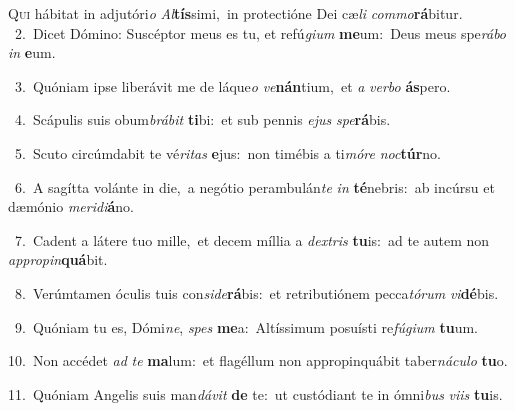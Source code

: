 \lettrine{\initial\textcolor{\initialcolor}{Q}}{ui} hábitat in adjutóri\textit{o} \textit{Al}\-\textbf{tís}simi,~\star in protectióne Dei cæ\textit{li} \textit{com}\-\textit{mo}\textbf{rá}bitur.\\
{\numbfont\textcolor{\numbcolor}{~2.}}~Dicet Dómino: Suscéptor meus es tu, et refú\-\textit{gi}\-\textit{um} \textbf{me}\-um:~\star Deus meus spe\-\textit{rá}\-\textit{bo} \textit{in} \textbf{e}\-um.\par
{\numbfont\textcolor{\numbcolor}{~3.}}~Quóniam ipse liberávit me de láque\textit{o} \textit{ve}\-\textbf{nán}tium,~\star et \textit{a} \textit{ver}\-\textit{bo} \textbf{ás}\-pero.\par
{\numbfont\textcolor{\numbcolor}{~4.}}~Scápulis suis obum\-\textit{brá}\-\textit{bit} \textbf{ti}\-bi:~\star et sub pennis \textit{e}\-\textit{jus} \textit{spe}\-\textbf{rá}bis.\par
{\numbfont\textcolor{\numbcolor}{~5.}}~Scuto circúmdabit te vé\-\textit{ri}\-\textit{tas} \textbf{e}\-jus:~\star non timébis a ti\-\textit{mó}\-\textit{re} \textit{noc}\-\textbf{túr}no.\par
{\numbfont\textcolor{\numbcolor}{~6.}}~A sagítta volánte in die,~\dagger a negótio perambulán\textit{te} \textit{in} \textbf{té}\-nebris:~\star ab incúrsu et dæmónio \textit{me}\-\textit{ri}\textit{di}\textbf{á}no.\par
{\numbfont\textcolor{\numbcolor}{~7.}}~Cadent a látere tuo mille,~\dagger et decem míllia a \textit{dex}\-\textit{tris} \textbf{tu}\-is:~\star ad te autem non \textit{ap}\-\textit{pro}\textit{pin}\textbf{quá}bit.\par
{\numbfont\textcolor{\numbcolor}{~8.}}~Verúmtamen óculis tuis con\-\textit{si}\-\textit{de}\textbf{rá}bis:~\star et retributiónem pecca\-\textit{tó}\-\textit{rum} \textit{vi}\-\textbf{dé}bis.\par
{\numbfont\textcolor{\numbcolor}{~9.}}~Quóniam tu es, Dómi\-\textit{ne}\-, \textit{spes} \textbf{me}\-a:~\star Altíssimum posuísti re\-\textit{fú}\-\textit{gi}\textit{um} \textbf{tu}\-um.\par
{\numbfont\textcolor{\numbcolor}{10.}}~Non accédet \textit{ad} \textit{te} \textbf{ma}\-lum:~\star et flagéllum non appropinquábit taber\-\textit{ná}\-\textit{cu}\textit{lo} \textbf{tu}\-o.\par
{\numbfont\textcolor{\numbcolor}{11.}}~Quóniam Angelis suis man\-\textit{dá}\-\textit{vit} \textbf{de} te:~\star ut custódiant te in ómni\textit{bus} \textit{vi}\-\textit{is} \textbf{tu}\-is.\par
